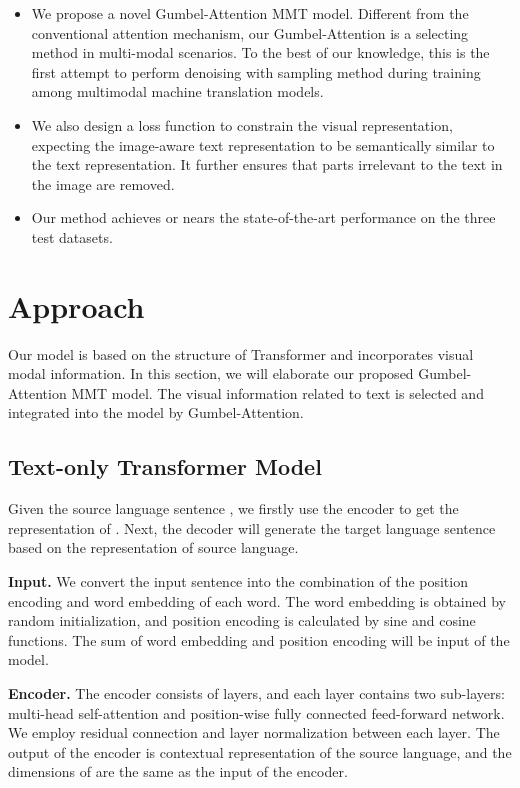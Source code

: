 \documentclass{article}
\begin{document}
\begin{itemize}
\item We propose a novel Gumbel-Attention MMT model. Different from the conventional attention mechanism, our Gumbel-Attention is a selecting method in multi-modal scenarios. To the best of our knowledge, this is the first attempt to perform denoising with sampling method during training among multimodal machine translation models.
\item We also design a loss function to constrain the visual representation, expecting the image-aware text representation to be semantically similar to the text representation. It further ensures that parts irrelevant to the text in the image are removed.
\item Our method achieves or nears the state-of-the-art performance on the three test datasets.
\end{itemize}

\section{Approach}


Our model is based on the structure of Transformer and incorporates visual modal information. 
In this section, we will elaborate our proposed Gumbel-Attention MMT model.
The visual information related to text is selected and integrated into the model by Gumbel-Attention.
\subsection{Text-only Transformer Model}
Given the source language sentence , we firstly use the encoder to get the  representation of . Next, the decoder will generate the target language sentence  based on the representation of source language. 

\textbf{Input.} We convert the input sentence into the combination of the position encoding and word embedding of each word. The word embedding is obtained by random initialization, and position encoding is calculated by sine and cosine functions. The sum  of word embedding and position encoding will be input of the model.

\textbf{Encoder.} The encoder consists of  layers, and each layer contains two sub-layers: multi-head self-attention and position-wise fully connected feed-forward network. We employ residual connection and layer normalization between each layer. The output of the encoder  is contextual representation of the source language, and the dimensions of  are the same as the input  of the encoder.
\end{document}
